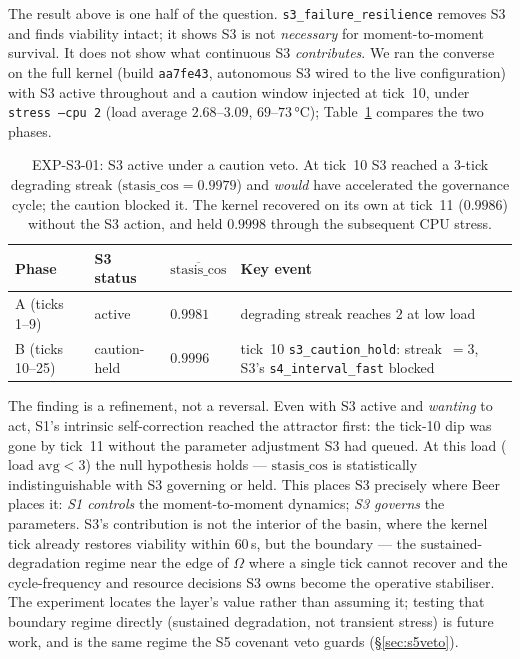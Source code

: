 \documentclass[11pt, a4paper]{article}
\begin{document}
The result above is one half of the question. \texttt{s3\_failure\_resilience}
removes S3 and finds viability intact; it shows S3 is not \emph{necessary} for
moment-to-moment survival. It does not show what continuous S3 \emph{contributes}.
We ran the converse on the full kernel (build \texttt{aa7fe43}, autonomous S3 wired
to the live configuration) with S3 active throughout and a caution window injected at
tick~10, under \texttt{stress\,--cpu\,2} (load average $2.68$--$3.09$, $69$--$73$\,°C);
Table~\ref{tab:s3continuous} compares the two phases.

\begin{table}[!htb]
\centering
\small
\begin{tabular}{llll}
\toprule
Phase & S3 status & $\overline{\text{stasis\_cos}}$ & Key event \\
\midrule
A (ticks 1--9)   & active        & $0.9981$ & degrading streak reaches $2$ at low load \\
B (ticks 10--25) & caution-held  & $0.9996$ & tick~10 \texttt{s3\_caution\_hold}: streak~$=3$,
                                              S3's \texttt{s4\_interval\_fast} blocked \\
\bottomrule
\end{tabular}
\caption{EXP-S3-01: S3 active under a caution veto. At tick~10 S3 reached a
$3$-tick degrading streak ($\text{stasis\_cos}=0.9979$) and \emph{would} have
accelerated the governance cycle; the caution blocked it. The kernel recovered on its
own at tick~11 ($0.9986$) without the S3 action, and held $0.9998$ through the
subsequent CPU stress.}
\label{tab:s3continuous}
\end{table}

The finding is a refinement, not a reversal. Even with S3 active and \emph{wanting} to
act, S1's intrinsic self-correction reached the attractor first: the tick-10 dip was
gone by tick~11 without the parameter adjustment S3 had queued. At this load
($\text{load avg} < 3$) the null hypothesis holds --- $\text{stasis\_cos}$ is
statistically indistinguishable with S3 governing or held. This places S3 precisely
where Beer places it: \emph{S1 controls} the moment-to-moment dynamics; \emph{S3
governs} the parameters. S3's contribution is not the interior of the basin, where
the kernel tick already restores viability within $60$\,s, but the boundary --- the
sustained-degradation regime near the edge of $\Omega$ where a single tick cannot
recover and the cycle-frequency and resource decisions S3 owns become the operative
stabiliser. The experiment locates the layer's value rather than assuming it; testing
that boundary regime directly (sustained degradation, not transient stress) is future
work, and is the same regime the S5 covenant veto guards (\S\ref{sec:s5veto}).
\end{document}
